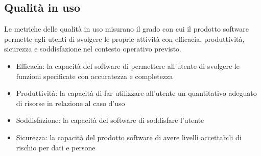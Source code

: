 \subsection{Qualità in uso}
Le metriche delle qualità in uso misurano il grado con cui il prodotto software permette agli utenti di svolgere le proprie attività con efficacia, produttività, sicurezza e soddisfazione nel contesto operativo previsto.
\begin{itemize}
\item Efficacia: la capacità del software di permettere all'utente di svolgere le funzioni specificate con accuratezza e completezza
\item Produttività: la capacità di far utilizzare all'utente un quantitativo adeguato di risorse in relazione al caso d'uso
\item Soddisfazione: la capacità del software di soddisfare l'utente
\item Sicurezza: la capacità del prodotto software di avere livelli accettabili di rischio per dati e persone
\end{itemize}